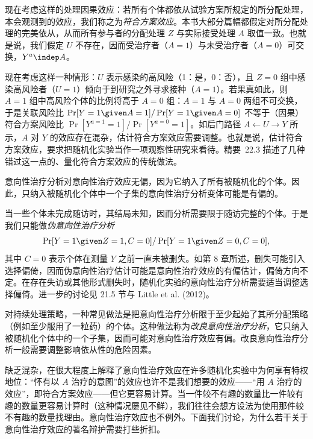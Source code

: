 现在考虑这样的处理因果效应：若所有个体都依从试验方案所规定的所分配处理，本会观测到的效应，我们称之为\emph{符合方案效应}。本书大部分篇幅都假定对所分配处理的完美依从，从而所有参与者的分配处理 $Z$ 与实际接受处理 $A$ 取值一致。也就是说，我们假定 $U$ 不存在，因而受治疗者（$A=1$）与未受治疗者（$A=0$）可交换，$Y^{a}\indep A$。

现在考虑这样一种情形：$U$ 表示感染的高风险（1：是，0：否），且 $Z=0$ 组中感染高风险者（$U=1$）倾向于到研究之外寻求接种（$A=1$）。若果真如此，则 $A=1$ 组中高风险个体的比例将高于 $A=0$ 组：$A=1$ 与 $A=0$ 两组不可交换，于是关联风险比 $\Pr[Y=1\given A=1]/\Pr[Y=1\given A=0]$ 不等于（因果）符合方案风险比 $\Pr[Y^{a=1}=1]/\Pr[Y^{a=0}=1]$。如后门路径 $A\leftarrow U\to Y$ 所示，$A$ 对 $Y$ 的效应存在混杂，估计符合方案效应需要调整。也就是说，估计符合方案效应，要求把随机化实验当作一项观察性研究来看待。精要~22.3 描述了几种错过这一点的、量化符合方案效应的传统做法。

\begin{finepoint}[伪意向性治疗分析与改良意向性治疗分析]
意向性治疗分析对意向性治疗效应无偏，因为它纳入了所有被随机化的个体。因此，只纳入被随机化个体中一个子集的意向性治疗分析变体可能是有偏的。

当一些个体未完成随访时，其结局未知，因而分析需要限于随访完整的个体。于是我们只能做\emph{伪意向性治疗分析}
\[
\Pr[Y=1\given Z=1,C=0]/\Pr[Y=1\given Z=0,C=0],
\]
其中 $C=0$ 表示个体在测量 $Y$ 之前一直未被删失。如第 8 章所述，删失可能引入选择偏倚，因而伪意向性治疗估计可能是意向性治疗效应的有偏估计，偏倚方向不定。在存在失访或其他形式删失时，随机化实验的意向性治疗分析需要适当调整选择偏倚。进一步的讨论见 21.5 节与 Little et al. (2012)。

对持续处理策略，一种常见做法是把意向性治疗分析限于至少起始了其所分配策略（例如至少服用了一粒药）的个体。这种做法称为\emph{改良意向性治疗分析}，它只纳入被随机化个体中的一个子集，因而可能对意向性治疗效应有偏。改良意向性治疗分析一般需要调整影响依从性的危险因素。
\end{finepoint}

缺乏混杂，在很大程度上解释了意向性治疗效应在许多随机化实验中为何享有特权地位：“怀有以 $A$ 治疗的意图”的效应也许不是我们想要的效应——“用 $A$ 治疗的效应”，即符合方案效应——但它更容易计算。当一件较不有趣的数量比一件较有趣的数量更容易计算时（这种情况屡见不鲜），我们往往会想方设法为使用那件较不有趣的数量找理由。意向性治疗效应也不例外。下面我们讨论，为什么若干关于意向性治疗效应的著名辩护需要打些折扣。

